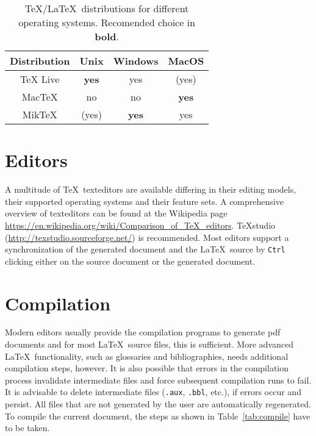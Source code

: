 \begin{table}
    \centering
    \begin{tabular}{cccc}
        \toprule
        Distribution & Unix         & Windows      & MacOS        \\
        \midrule
        TeX Live     & \textbf{yes} & yes          & (yes)        \\
        MacTeX       & no           & no           & \textbf{yes} \\
        MikTeX       & (yes)        & \textbf{yes} & yes          \\
        \bottomrule
    \end{tabular}
    \caption{\TeX/\LaTeX\ distributions for different operating systems. Recomended choice in \textbf{bold}.}
    \label{tab:distrib} %
\end{table}


\section{Editors}

A multitude of \TeX\ \glspl{texteditor} are available differing in their editing models, their supported operating systems and their feature sets.
A comprehensive overview of \glspl{texteditor} can be found at the Wikipedia page  \url{https://en.wikipedia.org/wiki/Comparison_of_TeX_editors}.
TeXstudio (\url{http://texstudio.sourceforge.net/}) is recommended.
Most editors support a synchronization of the generated document and the \LaTeX\ source by \verb|Ctrl| clicking either on the source document or the generated document.


\section{Compilation}

Modern editors usually provide the compilation programs to generate \gls{pdf} documents and for most \LaTeX\ source files, this is sufficient.
More advanced \LaTeX\ functionality, such as glossaries and bibliographies, needs additional compilation steps, however.
It is also possible that errors in the compilation process invalidate intermediate files and force subsequent compilation runs to fail.
It is advisable to delete intermediate files (\verb|.aux|, \verb|.bbl|, etc.), if errors occur and persist.
All files that are not generated by the user are automatically regenerated.
To compile the current document, the steps as shown in Table~\ref{tab:compile} have to be taken.


